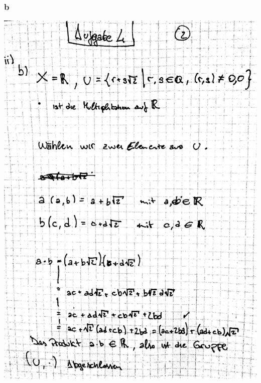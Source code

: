 \documentclass[12pt,a4paper]{article}
\begin{document}
\subsubsection{b}
\includegraphics[scale=0.2]{lat4f_3.jpg} 
\end{document}
